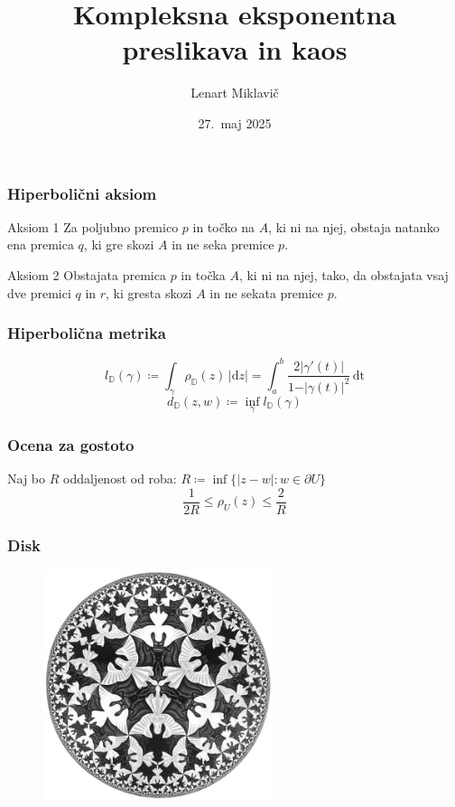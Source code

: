 \documentclass{beamer}
\title{Kompleksna eksponentna preslikava in kaos}
\author[Lenart Miklavič]{Lenart Miklavič}
\institute[FMF]{Fakulteta za matematiko in fiziko}
\date{27.~maj 2025}
\newcommand{\DD}{\mathbb{D}}
\theoremstyle{definition}
\theoremstyle{plain}
\begin{document}
\maketitle

\begin{frame}
  \frametitle{Hiperbolični aksiom}

  \begin{block}{Aksiom 1}
    Za poljubno premico \(p\) in točko na \(A\), ki ni na njej, obstaja natanko ena premica \(q\), ki gre skozi \(A\) in ne seka premice \(p\).
  \end{block}

  \begin{block}{Aksiom 2}
    Obstajata premica \(p\) in točka \(A\), ki ni na njej, tako, da obstajata vsaj dve premici \(q\) in \(r\), ki gresta skozi \(A\) in ne sekata premice \(p\).
  \end{block}

\end{frame}

\begin{frame}
  \frametitle{Hiperbolična metrika}

  \[l_{\DD} (\gamma) \coloneq \int_{\gamma} \rho_{\DD} (z) \, \vert \mathrm{d} z \vert = \int_{a}^{b} \frac{2 \vert \gamma' (t) \vert }{1 - \vert \gamma (t) \vert^2} \, \mathrm{d t}\]
  \vspace{1cm}
  \[d_{\DD} (z, w) \coloneq \inf_{\gamma} l_{\DD} (\gamma)\]

\end{frame}

\begin{frame}
  \frametitle{Ocena za gostoto}

  \begin{block}{Naj bo \(R\) oddaljenost od roba: \(R \coloneq \inf \{ \vert z - w \vert : w \in \partial U\}\)}  
    \[\frac{1}{2 R} \leq \rho_U (z) \leq \frac{2}{R}\]
  \end{block}

\end{frame}

\begin{frame}
  \frametitle{Disk}
  \centering
  \begin{figure}
    
    \includegraphics[width=0.6\textwidth]{a.jpg}
  \end{figure}
\end{frame}
\end{document}
